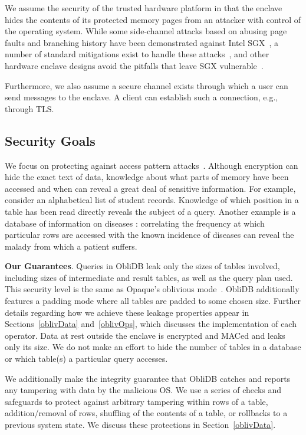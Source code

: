 \documentclass[letterpaper,twocolumn,10pt]{article}
\newcommand{\ignore}[1]{}
\def\name/{ObliDB}
\begin{document}
We assume the security of the trusted hardware platform in that the enclave hides the contents of its protected memory pages from an attacker with control of the operating system. While some side-channel attacks based on abusing page faults and branching history have been demonstrated against Intel SGX~\cite{LSG+16,XCP15}, a number of standard mitigations exist to handle these attacks~\cite{SCNS16,RLT15,SLK+17,SLKP17}, and other hardware enclave designs avoid the pitfalls that leave SGX vulnerable~\cite{CLD16, LHM+15, MLS+13}.

Furthermore, we also assume a secure channel exists through which a user can send messages to the enclave. A client can establish such a connection, e.g., through TLS. \ignore{ (this is fairly straightforward with SGX), but we did not implement this for our tests, as it is not directly related to the functionality provided by \name/.}

\subsection{Security Goals}
We focus on protecting against access pattern attacks~\cite{IKK12}. Although encryption can hide the exact text of data, knowledge about what parts of memory have been accessed and when can reveal a great deal of sensitive information. For example, consider an alphabetical list of student records. Knowledge of which position in a table has been read directly reveals the subject of a query. Another example is a database of information on diseases \cite{ZDB+17}: correlating the frequency at which particular rows are accessed with the known incidence of diseases can reveal the malady from which a patient suffers.

\noindent \textbf{Our Guarantees}. Queries in \name/ leak only the sizes of tables involved, including sizes of intermediate and result tables, as well as the query plan used. This security level is the same as Opaque's oblivious mode~\cite{ZDB+17}. \name/ additionally features a padding mode where all tables are padded to some chosen size. Further details regarding how we achieve these leakage properties appear in Sections~\ref{oblivData} and~\ref{oblivOps}, which discusses the implementation of each operator. Data at rest outside the enclave is encrypted and MACed and leaks only its size. We do not make an effort to hide the number of tables in a database or which table(s) a particular query accesses.

We additionally make the integrity guarantee that \name/ catches and reports any tampering with data by the malicious OS. We use a series of checks and safeguards to protect against arbitrary tampering within rows of a table, addition/removal of rows, shuffling of the contents of a table, or rollbacks to a previous system state. We discuss these protections in Section~\ref{oblivData}.
\end{document}
